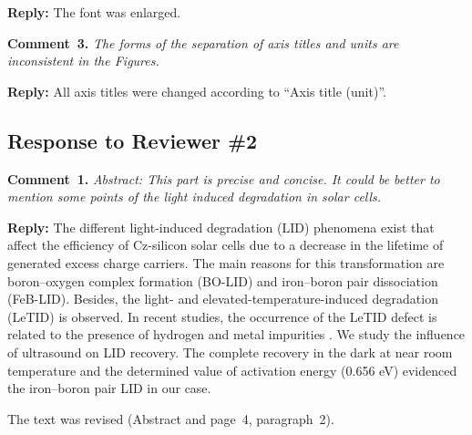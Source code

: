 \documentclass[sn-mathphys]{sn-jnl}
\begin{document}
\noindent
\textcolor[rgb]{0.51,0.00,0.00}{\textbf{Reply:}}
The font was enlarged.

\vspace{1cm}
\noindent
\textcolor[rgb]{0.00,0.50,1.00}{\textbf{Comment~3.}}
\emph{The forms of the separation of axis titles and units are inconsistent in the Figures.}

\noindent
\textcolor[rgb]{0.51,0.00,0.00}{\textbf{Reply:}}
All axis titles were changed according to ``Axis title (unit)''.


\subsection*{Response to Reviewer \#2 }
\noindent
\textcolor[rgb]{0.00,0.50,1.00}{\textbf{Comment~1.}}
\emph{Abstract: This part is precise and concise.
It could be better to mention some points of the light induced degradation in solar cells.}

\noindent
\textcolor[rgb]{0.51,0.00,0.00}{\textbf{Reply:}}
The different light-induced degradation (LID) phenomena exist that affect the efficiency
of Cz-silicon solar cells due to a decrease in the lifetime of generated excess charge carriers.
The main reasons for this transformation are boron--oxygen complex formation (BO-LID) \cite{LIDRev} and
iron--boron pair dissociation (FeB-LID).
Besides, the light- and elevated-temperature-induced degradation (LeTID) is observed.
In recent studies, the occurrence of the LeTID defect is related
to the presence of hydrogen and metal impurities \cite{LeTID_H,LeTID_Me,LeTID_Me2}.
We study the  influence of ultrasound on LID recovery.
The complete recovery in the dark at near room temperature and the determined value
of activation energy (0.656 eV) evidenced the iron--boron pair LID in our case.

The text was revised (Abstract and page~4, paragraph~2).

%
%
%
%
%
%
%
%
\end{document}
